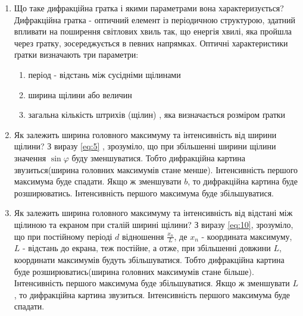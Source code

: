 \begin{enumerate}
    \item Що таке дифракційна гратка і якими параметрами вона характеризується?
    \bigbreak
    Дифракційна гратка - оптичний елемент із періодичною 
    структурою, здатний впливати на поширення світлових хвиль так,
    що енергія хвилі, яка пройшла через гратку, зосереджується 
    в певних напрямках.  Оптичні характеристики ґратки визначають три параметри:
    \begin{enumerate}
        \item період - відстань між сусідніми щілинами
        \item ширина щілини або величин
        \item загальна кількість штрихів (щілин) , яка визначається розміром ґратки
    \end{enumerate}    


    \item Як залежить ширина головного максимуму та інтенсивність від ширини щілини?
    \bigbreak
    З виразу  \ref{eq:5} , зрозуміло, що при збільшенні
    ширини щілини значення $\sin \varphi$ буду зменшуватися.
    Тобто дифракційна картина звузиться(ширина головних максимумів стане менше).
    Інтенсивність першого максимума буде спадати.
    Якщо ж зменшувати $b$, то дифракційна 
    картина буде розширюватись. Інтенсивність першого максимума буде збільшуватися.

    \item Як залежить ширина головного максимуму та інтенсивність від відстані між щілиною та екраном при сталій ширині щілини?
    \bigbreak
    З виразу  \ref{eq:10}, зрозуміло, що при постійному періоді $d$
    відношення $\frac{x_n}{L}$, де $x_n$ - координата максимуму,
    $L$ - відстань до екрана, теж постійне, а отже, при збільшенні довжини
    $L$, координати максимумів будуть збільшуватися. 
    Тобто дифракційна картина буде розширюватись(ширина головних максимумів стане більше).     
    Інтенсивність першого максимума буде збільшуватися.
    Якщо ж зменшувати $L$, то дифракційна картина звузиться.
    Інтенсивність першого максимума буде спадати.

    
\end{enumerate}